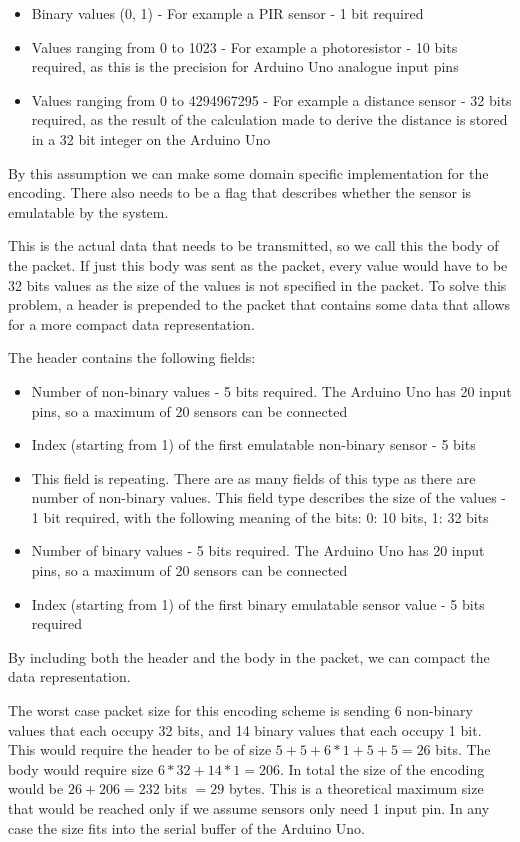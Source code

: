 \begin{itemize}
\item Binary values (0, 1) - For example a PIR sensor - 1 bit required
\item Values ranging from 0 to 1023 - For example a photoresistor - 10 bits required, as this is the precision for Arduino Uno analogue input pins
\item Values ranging from 0 to 4294967295 - For example a distance sensor - 32 bits required, as the result of the calculation made to derive the distance is stored in a 32 bit integer on the Arduino Uno
\end{itemize}
By this assumption we can make some domain specific implementation for the encoding.
There also needs to be a flag that describes whether the sensor is emulatable by the system.

This is the actual data that needs to be transmitted, so we call this the body of the packet. If just this body was sent as the packet, every value would have to be 32 bits values as the size of the values is not specified in the packet. To solve this problem, a header is prepended to the packet that contains some data that allows for a more compact data representation.

The header contains the following fields:

\begin{itemize}
\item Number of non-binary values - 5 bits required. The Arduino Uno has 20 input pins, so a maximum of 20 sensors can be connected
\item Index (starting from 1) of the first emulatable non-binary sensor - 5 bits
\item This field is repeating. There are as many fields of this type as there are number of non-binary values. This field type describes the size of the values - 1 bit required, with the following meaning of the bits: 0: 10 bits, 1: 32 bits
\item Number of binary values - 5 bits required. The Arduino Uno has 20 input pins, so a maximum of 20 sensors can be connected
\item Index (starting from 1) of the first binary emulatable sensor value - 5 bits required
\end{itemize}

By including both the header and the body in the packet, we can compact the data representation.

The worst case packet size for this encoding scheme is sending 6 non-binary values that each occupy 32 bits, and 14 binary values that each occupy 1 bit. This would require the header to be of size $5 + 5 + 6 * 1 + 5 + 5 = 26$ bits. The body would require size $6 * 32 + 14 * 1 = 206$. In total the size of the encoding would be $26 + 206 = 232$ bits $= 29$ bytes. This is a theoretical maximum size that would be reached only if we assume sensors only need 1 input pin. In any case the size fits into the serial buffer of the Arduino Uno.

